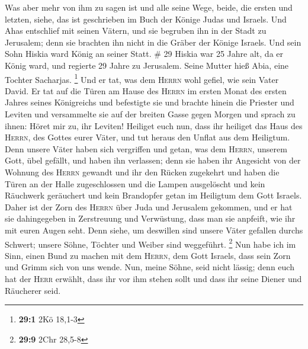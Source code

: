  Was aber mehr von ihm zu sagen ist und alle seine Wege,
beide, die ersten und letzten, siehe, das ist geschrieben im Buch der
Könige Judas und Israels.  Und Ahas entschlief mit seinen
Vätern, und sie begruben ihn in der Stadt zu Jerusalem; denn sie
brachten ihn nicht in die Gräber der Könige Israels. Und sein Sohn
Hiskia ward König an seiner Statt. \# 29  Hiskia war 25
Jahre alt, da er König ward, und regierte 29 Jahre zu Jerusalem. Seine
Mutter hieß Abia, eine Tochter Sacharjas. \footnote{\textbf{29:1} 2Kö
  18,1-3}  Und er tat, was dem \textsc{Herrn} wohl gefiel,
wie sein Vater David.  Er tat auf die Türen am Hause des
\textsc{Herrn} im ersten Monat des ersten Jahres seines Königreichs und
befestigte sie  und brachte hinein die Priester und
Leviten und versammelte sie auf der breiten Gasse gegen Morgen
 und sprach zu ihnen: Höret mir zu, ihr Leviten! Heiliget
euch nun, dass ihr heiliget das Haus des \textsc{Herrn}, des Gottes
eurer Väter, und tut heraus den Unflat aus dem Heiligtum. 
Denn unsere Väter haben sich vergriffen und getan, was dem
\textsc{Herrn}, unserem Gott, übel gefällt, und haben ihn verlassen;
denn sie haben ihr Angesicht von der Wohnung des \textsc{Herrn} gewandt
und ihr den Rücken zugekehrt  und haben die Türen an der
Halle zugeschlossen und die Lampen ausgelöscht und kein Räuchwerk
geräuchert und kein Brandopfer getan im Heiligtum dem Gott Israels.
 Daher ist der Zorn des \textsc{Herrn} über Juda und
Jerusalem gekommen, und er hat sie dahingegeben in Zerstreuung und
Verwüstung, dass man sie anpfeift, wie ihr mit euren Augen seht.
 Denn siehe, um deswillen sind unsere Väter gefallen
durchs Schwert; unsere Söhne, Töchter und Weiber sind weggeführt.
\footnote{\textbf{29:9} 2Chr 28,5-8}  Nun habe ich im
Sinn, einen Bund zu machen mit dem \textsc{Herrn}, dem Gott Israels,
dass sein Zorn und Grimm sich von uns wende.  Nun, meine
Söhne, seid nicht lässig; denn euch hat der \textsc{Herr} erwählt, dass
ihr vor ihm stehen sollt und dass ihr seine Diener und Räucherer seid.

